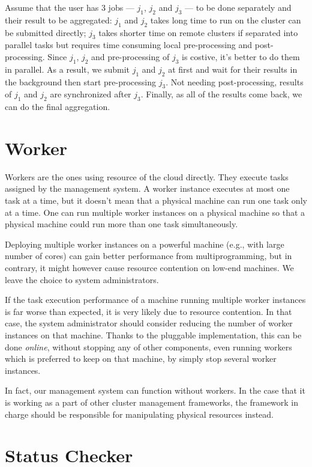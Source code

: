 {Assume that the user has 3 jobs --- $j_1$, $j_2$ and $j_3$ --- to be
done separately and their result to be aggregated:  $j_1$ and $j_2$
takes long time to run on the cluster can be submitted directly; $j_3$
takes shorter time on remote clusters if separated into parallel tasks
but requires time consuming local pre-processing and post-processing.
Since $j_1$, $j_2$ and pre-processing of $j_3$ is costive, it's better
to do them in parallel.
As a result, we submit $j_1$ and $j_2$ at first and wait for their
results in the background then start pre-processing $j_3$. Not needing
post-processing, results of $j_1$ and $j_2$ are synchronized after
$j_3$.
Finally, as all of the results come back, we can do the final
aggregation.

\section{Worker}

Workers are the ones using resource of the cloud directly.
They execute tasks assigned by the management system.
A worker instance executes at most one task at a time, but it doesn't
mean that a physical machine can run one task only at a time.
One can run multiple worker instances on a physical machine so that a
physical machine could run more than one task simultaneously.	 

Deploying multiple worker instances on a powerful machine (e.g., with
large number of cores) can gain better performance from
multiprogramming, but in contrary, it might however cause resource
contention on low-end machines.
We leave the choice to system administrators.


If the task execution performance of a machine running multiple worker
instances is far worse than expected, it is very likely due to resource
contention.
In that case, the system administrator should consider reducing the
number of worker instances on that machine.
Thanks to the pluggable implementation, this can be done \emph{online},
without stopping any of other components, even running workers which is
preferred to keep on that machine, by simply stop several worker
instances.

In fact, our management system can function without workers.
In the case that it is working as a part of other cluster management
frameworks, the framework in charge should be responsible for
manipulating physical resources instead.

\section{Status Checker}

}

